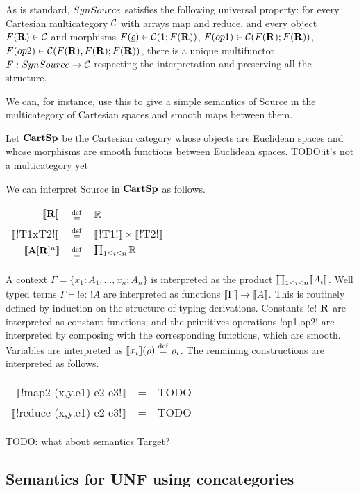 As is standard, $SynSource$ satisfies the following universal property: 
for every Cartesian multicategory $\mathcal{C}$ with arrays map and reduce,
and every object $F(\mathbf{R})\in\mathcal{C}$ and morphisms $F(\underline{c})\in\mathcal{C}(1;F(\mathbf{R}))$, 
$F(op1)\in\mathcal{C}(F(\mathbf{R});F(\mathbf{R}))$, $F(op2)\in\mathcal{C}(F(\mathbf{R}),F(\mathbf{R});F(\mathbf{R}))$, there is a unique
multifunctor $F:SynSource\to\mathcal{C}$ respecting the interpretation and preserving all the structure.

We can, for instance, use this to give a simple semantics of Source 
in the multicategory of Cartesian spaces and smooth maps between them. 

\begin{definition}[$\CartSp$]
Let $\CartSp$ be the Cartesian category whose objects are Euclidean spaces
and whose morphisms are smooth functions between Euclidean spaces.
TODO:it's not a multicategory yet

We can interpret Source in $\CartSp$ as follows.
    \begin{tabular}{r c l}
    $\llbracket \mathbf{R} \rrbracket$ & $\stackrel {\mathrm{def}}=$& $\mathbb{R}$ \\
    $\llbracket$!T1xT2!$\rrbracket$ & $\stackrel {\mathrm{def}}=$& $\llbracket$!T1!$\rrbracket \times\llbracket$!T2!$\rrbracket$ \\
    $\llbracket \mathbf{A}[\mathbf{R}]^{n}\rrbracket$ & $\stackrel {\mathrm{def}}=$ & $\prod_{1\leq i \leq n} \mathbb{R}$ 
    \end{tabular}
A context $\Gamma=\{x_1:A_1,\ldots,x_n:A_n\}$ is interpreted as the product $\prod_{1\leq i \leq n}\llbracket A_i\rrbracket$.
Well typed terms $\Gamma\vdash$!e: !$A$ are interpreted as functions $\llbracket \Gamma\rrbracket\to\llbracket A\rrbracket$. This is
routinely defined by induction on the structure of typing derivations. Constants
!c! $\mathbf{R}$ are interpreted as constant functions; and the primitives operations !op1,op2!
are interpreted by composing with the corresponding functions, which are smooth. 
Variables are interpreted as $\llbracket x_i\rrbracket(\rho)\stackrel {\mathrm{def}}= \rho_i$. 
The remaining constructions are interpreted as follows.
\begin{tabular}{r c l}
    $\llbracket$!map2 (x,y.e1) e2 e3!$\rrbracket$ &=& TODO\\
    $\llbracket$!reduce (x,y.e1) e2 e3!$\rrbracket$ &=& TODO
\end{tabular}
\end{definition}

TODO: what about semantics Target?

\subsection{Semantics for UNF using concategories} %
\label{sub:Semantics for UNF using concategories}

